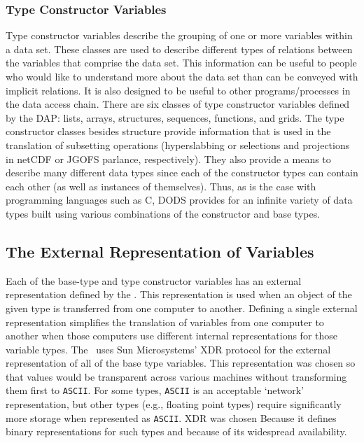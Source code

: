 \subsubsection{Type Constructor Variables} 

Type constructor variables describe the grouping of one or more variables
within a data set. These classes are used to describe different types of
relations between the variables that comprise the data set. This information
can be useful to people who would like to understand more about the data set
than can be conveyed with implicit relations. It is also designed to be
useful to other programs/processes in the data access chain.  There are six
classes of type constructor variables defined by the DAP: lists, arrays,
structures, sequences, functions, and grids. The type constructor classes
besides structure provide information that is used in the translation of
subsetting operations (hyperslabbing or selections and projections in netCDF
or JGOFS parlance, respectively). They also provide a means to describe many
different data types since each of the constructor types can contain each
other (as well as instances of themselves). Thus, as is the case with
programming languages such as C, DODS provides for an infinite variety of
data types built using various combinations of the constructor and base types\cite{horowitz:cpaper}.

\subsection{The External Representation of Variables}
\label{api:external-rep}

Each of the base-type and type constructor variables has an external
representation defined by the \dap. This representation is used when an
object of the given type is transferred from one computer to another.
Defining a single external representation simplifies the translation of
variables from one computer to another when those computers use different
internal representations for those variable types.  The \dap\ uses Sun
Microsystems' XDR\cite{sun:xdr} protocol for the external representation of
all of the base type variables. This representation was chosen so that
values would be transparent across various machines without transforming them
first to {\tt ASCII}. For some types, {\tt ASCII} is an acceptable `network'
representation, but other types (e.g., floating point types) require
significantly more storage when represented as {\tt ASCII}. XDR was chosen
Because it defines binary representations for such types\cite{sun:xdr} and
because of its widespread availability.

